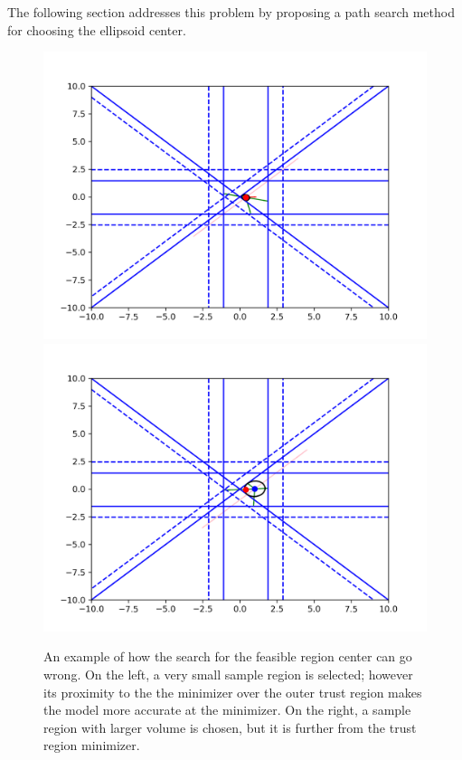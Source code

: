 The following section addresses this problem by proposing a path search method for choosing the ellipsoid center.

\begin{figure}[ht]
    \centering
    \includegraphics[scale=0.4]{images/everything_runs_1.png}
    \includegraphics[scale=0.4]{images/everything_runs_2.png}
    \caption[An example of how the search for the sample region center can go wrong.]{
    	An example of how the search for the feasible region center can go wrong.  
     	On the left, a very small sample region is selected; however its proximity to the the minimizer over the outer trust region makes the model more accurate at the minimizer.
    	On the right, a sample region with larger volume is chosen, but it is further from the trust region minimizer.
	}
    \label{ellipse_runs_away}
\end{figure}


